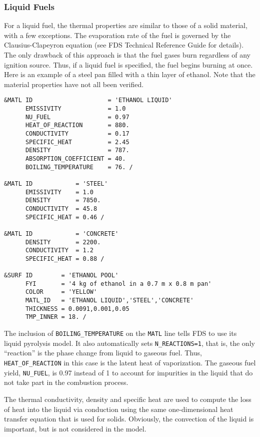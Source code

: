 \documentclass[11pt]{book}
\newcommand{\ct}{\tt\small}
\begin{document}
\subsubsection{Liquid Fuels}

For a liquid fuel, the thermal properties are similar to those of a solid
material, with a few exceptions. The evaporation rate of the fuel
is governed by the Clausius-Clapeyron equation (see FDS Technical Reference
Guide for details). The only drawback of
this approach is that the fuel gases burn regardless of any ignition
source. Thus, if a liquid fuel is specified, the fuel
begins burning at once. Here is an example of a steel pan filled with a thin layer of ethanol. Note that the material
properties have not all been verified.

\footnotesize
\begin{verbatim}
&MATL ID                     = 'ETHANOL LIQUID'
      EMISSIVITY             = 1.0
      NU_FUEL                = 0.97
      HEAT_OF_REACTION       = 880.
      CONDUCTIVITY           = 0.17
      SPECIFIC_HEAT          = 2.45
      DENSITY                = 787.
      ABSORPTION_COEFFICIENT = 40.
      BOILING_TEMPERATURE    = 76. /

&MATL ID            = 'STEEL'
      EMISSIVITY    = 1.0
      DENSITY       = 7850.
      CONDUCTIVITY  = 45.8
      SPECIFIC_HEAT = 0.46 /

&MATL ID            = 'CONCRETE'
      DENSITY       = 2200.
      CONDUCTIVITY  = 1.2
      SPECIFIC_HEAT = 0.88 /

&SURF ID        = 'ETHANOL POOL'
      FYI       = '4 kg of ethanol in a 0.7 m x 0.8 m pan'
      COLOR     = 'YELLOW'
      MATL_ID   = 'ETHANOL LIQUID','STEEL','CONCRETE'
      THICKNESS = 0.0091,0.001,0.05
      TMP_INNER = 18. /
\end{verbatim} \normalsize

\noindent
The inclusion of {\ct BOILING\_TEMPERATURE} on the {\ct MATL} line tells FDS to use its liquid
pyrolysis model. It also automatically sets {\ct N\_REACTIONS=1}, that is, the only ``reaction'' is the
phase change from liquid to gaseous fuel. Thus, {\ct HEAT\_OF\_REACTION} in this case is the latent
heat of vaporization. The gaseous fuel yield, {\ct NU\_FUEL}, is 0.97 instead of 1 to account for
impurities in the liquid that do not take part in the combustion process.

The thermal conductivity, density and specific heat are used
to compute the loss of heat into the liquid via conduction using the
same one-dimensional heat transfer equation that is used for solids. Obviously,
the convection of the liquid is important, but is not considered in
the model.
\end{document}
